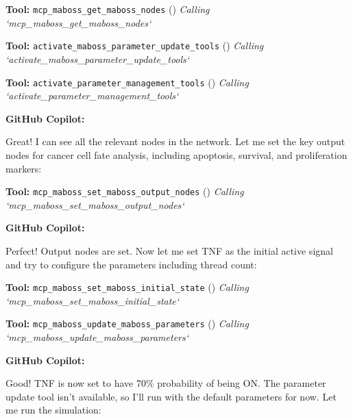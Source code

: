 \documentclass[11pt,a4paper]{article}
\begin{document}
\begin{toolokbox}
\textbf{Tool:} \texttt{mcp\_maboss\_get\_maboss\_nodes} (\checkmark)
\textit{Calling `mcp\_maboss\_get\_maboss\_nodes`}
\end{toolokbox}
\begin{toolokbox}
\textbf{Tool:} \texttt{activate\_maboss\_parameter\_update\_tools} (\checkmark)
\textit{Calling `activate\_maboss\_parameter\_update\_tools`}
\end{toolokbox}
\begin{toolokbox}
\textbf{Tool:} \texttt{activate\_parameter\_management\_tools} (\checkmark)
\textit{Calling `activate\_parameter\_management\_tools`}
\end{toolokbox}
\begin{copilotbox}
\textbf{GitHub Copilot:}

Great! I can see all the relevant nodes in the network. Let me set the key output nodes for cancer cell fate analysis, including apoptosis, survival, and proliferation markers:

\end{copilotbox}
\begin{toolokbox}
\textbf{Tool:} \texttt{mcp\_maboss\_set\_maboss\_output\_nodes} (\checkmark)
\textit{Calling `mcp\_maboss\_set\_maboss\_output\_nodes`}
\end{toolokbox}
\begin{copilotbox}
\textbf{GitHub Copilot:}

Perfect! Output nodes are set. Now let me set TNF as the initial active signal and try to configure the parameters including thread count:

\end{copilotbox}
\begin{toolokbox}
\textbf{Tool:} \texttt{mcp\_maboss\_set\_maboss\_initial\_state} (\checkmark)
\textit{Calling `mcp\_maboss\_set\_maboss\_initial\_state`}
\end{toolokbox}
\begin{toolokbox}
\textbf{Tool:} \texttt{mcp\_maboss\_update\_maboss\_parameters} (\checkmark)
\textit{Calling `mcp\_maboss\_update\_maboss\_parameters`}
\end{toolokbox}
\begin{copilotbox}
\textbf{GitHub Copilot:}

Good! TNF is now set to have 70\% probability of being ON. The parameter update tool isn't available, so I'll run with the default parameters for now. Let me run the simulation:

\end{copilotbox}
\end{document}

